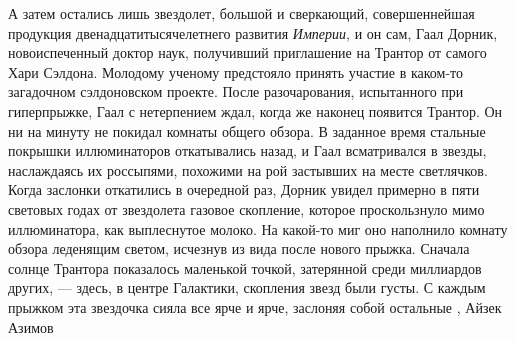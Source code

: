 А затем остались лишь звездолет, большой и сверкающий, совершеннейшая продукция
двенадцатитысячелетнего развития \emph{Империи}, и он сам, Гаал Дорник,
новоиспеченный доктор наук, получивший приглашение на Трантор от самого Хари
Сэлдона. Молодому ученому предстояло принять участие в каком-то загадочном
сэлдоновском проекте.  После разочарования, испытанного при гиперпрыжке, Гаал с
нетерпением ждал, когда же наконец появится Трантор. Он ни на минуту не покидал
комнаты общего обзора. В заданное время стальные покрышки иллюминаторов
откатывались назад, и Гаал всматривался в звезды, наслаждаясь их россыпями,
похожими на рой застывших на месте светлячков. Когда заслонки откатились в
очередной раз, Дорник увидел примерно в пяти световых годах от звездолета
газовое скопление, которое проскользнуло мимо иллюминатора, как выплеснутое
молоко. На какой-то миг оно наполнило комнату обзора леденящим светом, исчезнув
из вида после нового прыжка.  Сначала солнце Трантора показалось маленькой
точкой, затерянной среди миллиардов других, — здесь, в центре Галактики,
скопления звезд были густы. С каждым прыжком эта звездочка сияла все ярче и
ярче, заслоняя собой остальные
, Айзек Азимов
